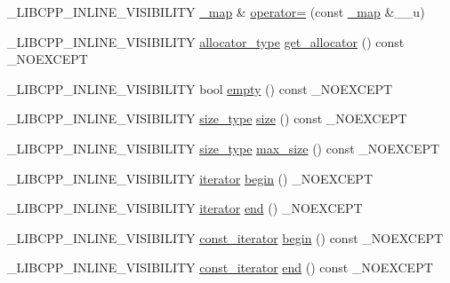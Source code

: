 \begin{DoxyCompactItemize}
\item 
\+\_\+\+L\+I\+B\+C\+P\+P\+\_\+\+I\+N\+L\+I\+N\+E\+\_\+\+V\+I\+S\+I\+B\+I\+L\+I\+T\+Y \hyperlink{class__map}{\+\_\+map} \& \hyperlink{class__map_a4cc910b666ace0199836222c888cc95f}{operator=} (const \hyperlink{class__map}{\+\_\+map} \&\+\_\+\+\_\+u)
\item 
\+\_\+\+L\+I\+B\+C\+P\+P\+\_\+\+I\+N\+L\+I\+N\+E\+\_\+\+V\+I\+S\+I\+B\+I\+L\+I\+T\+Y \hyperlink{class__map_ab38dd0bcf1867887afc2be61257ef025}{allocator\+\_\+type} \hyperlink{class__map_a98433b724b227865955d84f2d07c4796}{get\+\_\+allocator} () const \+\_\+\+N\+O\+E\+X\+C\+E\+P\+T
\item 
\+\_\+\+L\+I\+B\+C\+P\+P\+\_\+\+I\+N\+L\+I\+N\+E\+\_\+\+V\+I\+S\+I\+B\+I\+L\+I\+T\+Y bool \hyperlink{class__map_abc5765932f1e98ab450c328d75c4e8e6}{empty} () const \+\_\+\+N\+O\+E\+X\+C\+E\+P\+T
\item 
\+\_\+\+L\+I\+B\+C\+P\+P\+\_\+\+I\+N\+L\+I\+N\+E\+\_\+\+V\+I\+S\+I\+B\+I\+L\+I\+T\+Y \hyperlink{class__map_adc37f621be25fda072b12873e60e9fc7}{size\+\_\+type} \hyperlink{class__map_a7aec525ad4d8d4a4761659be91a44104}{size} () const \+\_\+\+N\+O\+E\+X\+C\+E\+P\+T
\item 
\+\_\+\+L\+I\+B\+C\+P\+P\+\_\+\+I\+N\+L\+I\+N\+E\+\_\+\+V\+I\+S\+I\+B\+I\+L\+I\+T\+Y \hyperlink{class__map_adc37f621be25fda072b12873e60e9fc7}{size\+\_\+type} \hyperlink{class__map_a54fcb51802c4480089ffedfe2917bb2c}{max\+\_\+size} () const \+\_\+\+N\+O\+E\+X\+C\+E\+P\+T
\item 
\+\_\+\+L\+I\+B\+C\+P\+P\+\_\+\+I\+N\+L\+I\+N\+E\+\_\+\+V\+I\+S\+I\+B\+I\+L\+I\+T\+Y \hyperlink{class__map_a9ed817d33532f34fc46649b3fbe8e612}{iterator} \hyperlink{class__map_a30a30dc9cbfe9aebdabf666ccd71e80c}{begin} () \+\_\+\+N\+O\+E\+X\+C\+E\+P\+T
\item 
\+\_\+\+L\+I\+B\+C\+P\+P\+\_\+\+I\+N\+L\+I\+N\+E\+\_\+\+V\+I\+S\+I\+B\+I\+L\+I\+T\+Y \hyperlink{class__map_a9ed817d33532f34fc46649b3fbe8e612}{iterator} \hyperlink{class__map_a039f8814d6e4724850ac09d38c0fa80a}{end} () \+\_\+\+N\+O\+E\+X\+C\+E\+P\+T
\item 
\+\_\+\+L\+I\+B\+C\+P\+P\+\_\+\+I\+N\+L\+I\+N\+E\+\_\+\+V\+I\+S\+I\+B\+I\+L\+I\+T\+Y \hyperlink{class__map_ab0513968c2610ccf3b3fe070184396aa}{const\+\_\+iterator} \hyperlink{class__map_aecfa05ebbd2d21c5c0485d15d12bd7c9}{begin} () const \+\_\+\+N\+O\+E\+X\+C\+E\+P\+T
\item 
\+\_\+\+L\+I\+B\+C\+P\+P\+\_\+\+I\+N\+L\+I\+N\+E\+\_\+\+V\+I\+S\+I\+B\+I\+L\+I\+T\+Y \hyperlink{class__map_ab0513968c2610ccf3b3fe070184396aa}{const\+\_\+iterator} \hyperlink{class__map_aabdf540cbbf51a167a1030a631a80d7e}{end} () const \+\_\+\+N\+O\+E\+X\+C\+E\+P\+T

\end{DoxyCompactItemize}
